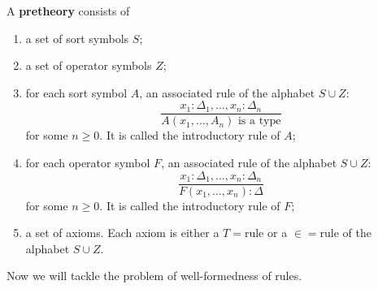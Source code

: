 \begin{definition}
    A \textbf{pretheory} consists of
    \begin{enumerate}
        \item a set of sort symbols $S$;
        \item a set of operator symbols $Z$;
        \item for each sort symbol $A$, an associated rule 
              of the alphabet $S \cup Z$:
              \begin{equation*}
                \dfrac{
                    x_1 : \Delta_1, \dots, x_n : \Delta_n
                }{
                    A(x_1, \dots, A_n) \text{ is a type}
                }
              \end{equation*}
              for some $n \geq 0$. It is called the introductory
              rule of $A$;
        \item for each operator symbol $F$, an associated rule
              of the alphabet $S \cup Z$:
              \begin{equation*}
                \dfrac{
                    x_1 : \Delta_1, \dots, x_n : \Delta_n
                }{
                    F(x_1, \dots, x_n) : \Delta
                }
              \end{equation*}
              for some $n \geq 0$. It is called the introductory
              rule of $F$;
        \item a set of axioms. Each axiom is either a $T=$rule or
              a $\in=$rule of the alphabet $S \cup Z$.

    \end{enumerate}
\end{definition}

Now we will tackle the problem of well-formedness of rules.

